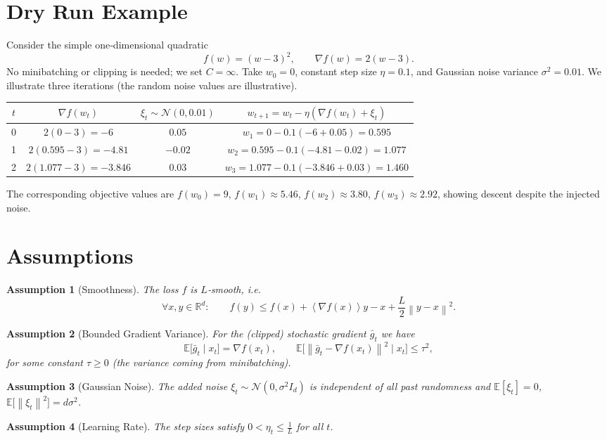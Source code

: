 \documentclass{article}
\newtheorem{assumption}{Assumption}
\newcommand{\E}{\mathbb{E}}
\newcommand{\R}{\mathbb{R}}
\newcommand{\norm}[1]{\left\|#1\right\|}
\newcommand{\inner}[1]{\left\langle#1\right\rangle}
\begin{document}
\section*{Dry Run Example}
Consider the simple one‑dimensional quadratic
\[
f(w)=(w-3)^{2},\qquad \nabla f(w)=2(w-3).
\]
No minibatching or clipping is needed; we set $C=\infty$.
Take $w_{0}=0$, constant step size $\eta=0.1$, and Gaussian noise variance
$\sigma^{2}=0.01$.  We illustrate three iterations (the random noise values are
illustrative).

\begin{center}
\begin{tabular}{c|c|c|c}
$t$ & $\nabla f(w_{t})$ & $\xi_{t}\sim\mathcal{N}(0,0.01)$ & $w_{t+1}=w_{t}-\eta(\nabla f(w_{t})+\xi_{t})$\\\hline
0 & $2(0-3)=-6$ & $0.05$ & $w_{1}=0-0.1(-6+0.05)=0.595$\\
1 & $2(0.595-3)=-4.81$ & $-0.02$ & $w_{2}=0.595-0.1(-4.81-0.02)=1.077$\\
2 & $2(1.077-3)=-3.846$ & $0.03$ & $w_{3}=1.077-0.1(-3.846+0.03)=1.460$\\
\end{tabular}
\end{center}

The corresponding objective values are
$f(w_{0})=9$, $f(w_{1})\approx5.46$, $f(w_{2})\approx3.80$, $f(w_{3})\approx2.92$,
showing descent despite the injected noise.

\newpage
\section*{Assumptions}
\begin{assumption}[Smoothness]\label{ass:smooth}
The loss $f$ is $L$‑smooth, i.e.
\[
\forall x,y\in\R^{d}:\qquad
f(y)\le f(x)+\inner{\nabla f(x)}{y-x}+\frac{L}{2}\norm{y-x}^{2}.
\]
\end{assumption}
\begin{assumption}[Bounded Gradient Variance]\label{ass:variance}
For the (clipped) stochastic gradient $\bar g_{t}$ we have
\[
\E\!\big[\bar g_{t}\mid x_{t}\big]=\nabla f(x_{t}),\qquad
\E\!\big[\norm{\bar g_{t}-\nabla f(x_{t})}^{2}\mid x_{t}\big]\le \tau^{2},
\]
for some constant $\tau\ge0$ (the variance coming from minibatching).
\end{assumption}
\begin{assumption}[Gaussian Noise]\label{ass:gauss}
The added noise $\xi_{t}\sim\mathcal{N}(0,\sigma^{2}I_{d})$ is independent of all past
randomness and $\E[\xi_{t}]=0$, $\E\!\big[\norm{\xi_{t}}^{2}\big]=d\sigma^{2}$.
\end{assumption}
\begin{assumption}[Learning Rate]\label{ass:lr}
The step sizes satisfy $0<\eta_{t}\le \frac{1}{L}$ for all $t$.
\end{assumption}
\end{document}
